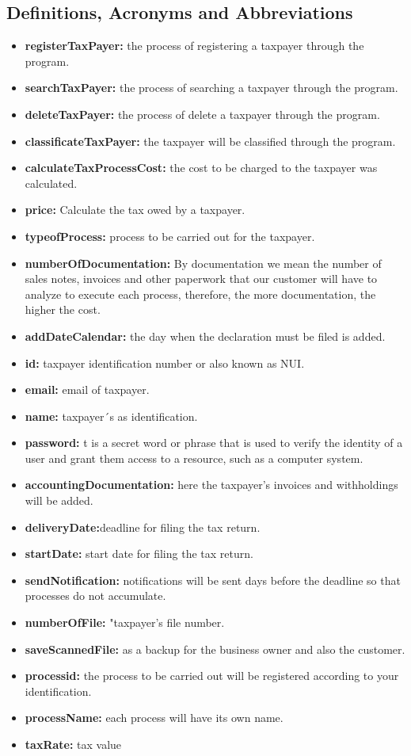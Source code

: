 \documentclass[12pt,a4paper, twosite]{article}
\begin{document}
\subsection{Definitions, Acronyms and Abbreviations}
\label{sec:orgb158e36}
\begin{itemize}
    \item \textbf{registerTaxPayer:} the process of registering a taxpayer through the program.
    \item \textbf{searchTaxPayer:} the process of searching a taxpayer through the program.
    \item \textbf{deleteTaxPayer:} the process of delete a taxpayer through the program.
    \item \textbf{classificateTaxPayer:} the taxpayer will be classified through the program.
    \item \textbf{calculateTaxProcessCost:} the cost to be charged to the taxpayer was calculated.
    \item \textbf{price:} Calculate the tax owed by a taxpayer.
    \item \textbf{typeofProcess:} process to be carried out for the taxpayer.
    \item \textbf{numberOfDocumentation:} By documentation we mean the number of sales notes, invoices and other paperwork that our customer will have to analyze to execute each process, therefore, the more documentation, the higher the cost. 
    \item \textbf{addDateCalendar:} the day when the declaration must be filed is added.
    \item \textbf{id:} taxpayer identification number or also known as NUI.
    \item \textbf{email:} email of taxpayer.
    \item \textbf{name:} taxpayer´s as identification.
    \item \textbf{password:} t is a secret word or phrase that is used to verify the identity of a user and grant them access to a resource, such as a computer system.
    \item \textbf{accountingDocumentation:} here the taxpayer's invoices and withholdings will be added.
    \item \textbf{deliveryDate:}deadline for filing the tax return.
    \item \textbf{startDate:} start date for filing the tax return.
    \item \textbf{sendNotification:} notifications will be sent days before the deadline so that processes do not accumulate.
    \item \textbf{numberOfFile:} "taxpayer's file number.
    \item \textbf{saveScannedFile:} as a backup for the business owner and also the customer.
    \item \textbf{processid:} the process to be carried out will be registered according to your identification.
    \item \textbf{processName:} each process will have its own name.
    \item \textbf{taxRate:} tax value
\end{itemize}
\end{document}
